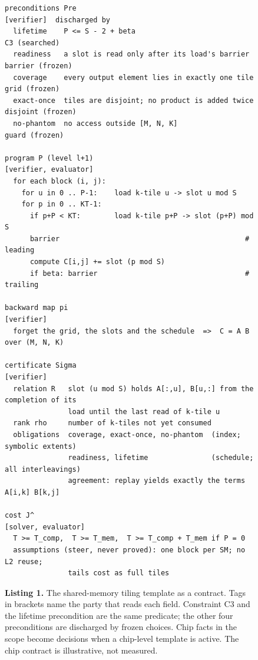 \documentclass[11pt]{article}
\begin{document}
\begin{figure}[tp]
\begin{framed}
\begin{verbatim}
preconditions Pre                                   [verifier]  discharged by
  lifetime    P <= S - 2 + beta                                 C3 (searched)
  readiness   a slot is read only after its load's barrier      barrier (frozen)
  coverage    every output element lies in exactly one tile     grid (frozen)
  exact-once  tiles are disjoint; no product is added twice     disjoint (frozen)
  no-phantom  no access outside [M, N, K]                       guard (frozen)

program P (level l+1)                                    [verifier, evaluator]
  for each block (i, j):
    for u in 0 .. P-1:    load k-tile u -> slot u mod S
    for p in 0 .. KT-1:
      if p+P < KT:        load k-tile p+P -> slot (p+P) mod S
      barrier                                            # leading
      compute C[i,j] += slot (p mod S)
      if beta: barrier                                   # trailing

backward map pi                                                    [verifier]
  forget the grid, the slots and the schedule  =>  C = A B over (M, N, K)

certificate Sigma                                                  [verifier]
  relation R   slot (u mod S) holds A[:,u], B[u,:] from the completion of its
               load until the last read of k-tile u
  rank rho     number of k-tiles not yet consumed
  obligations  coverage, exact-once, no-phantom  (index; symbolic extents)
               readiness, lifetime               (schedule; all interleavings)
               agreement: replay yields exactly the terms A[i,k] B[k,j]

cost J^                                                   [solver, evaluator]
  T >= T_comp,  T >= T_mem,  T >= T_comp + T_mem if P = 0
  assumptions (steer, never proved): one block per SM; no L2 reuse;
               tails cost as full tiles
\end{verbatim}
\end{framed}
\vspace{-0.6em}
{\small\textbf{Listing 1.} The shared-memory tiling template as a contract. Tags in brackets name the party that reads each field. Constraint C3 and the lifetime precondition are the same predicate; the other four preconditions are discharged by frozen choices. Chip facts in the scope become decisions when a chip-level template is active. The chip contract is illustrative, not measured.}
\end{figure}
\end{document}
